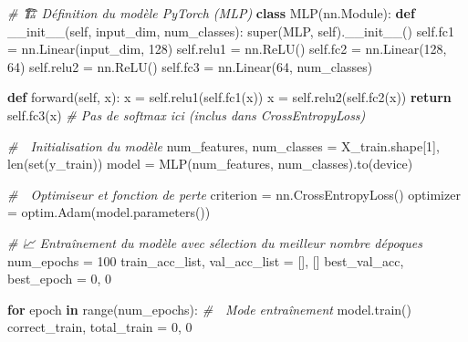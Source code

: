 \documentclass[
  letterpaper,
  DIV=11,
  numbers=noendperiod]{scrartcl}
\newenvironment{Shaded}{}{}
\newcommand{\BuiltInTok}[1]{\textcolor[rgb]{0.00,0.50,0.00}{#1}}
\newcommand{\CommentTok}[1]{\textcolor[rgb]{0.38,0.63,0.69}{\textit{#1}}}
\newcommand{\ControlFlowTok}[1]{\textcolor[rgb]{0.00,0.44,0.13}{\textbf{#1}}}
\newcommand{\DecValTok}[1]{\textcolor[rgb]{0.25,0.63,0.44}{#1}}
\newcommand{\FunctionTok}[1]{\textcolor[rgb]{0.02,0.16,0.49}{#1}}
\newcommand{\KeywordTok}[1]{\textcolor[rgb]{0.00,0.44,0.13}{\textbf{#1}}}
\newcommand{\NormalTok}[1]{#1}
\newcommand{\OperatorTok}[1]{\textcolor[rgb]{0.40,0.40,0.40}{#1}}
\newcommand{\VariableTok}[1]{\textcolor[rgb]{0.10,0.09,0.49}{#1}}
\begin{document}
\begin{Shaded}
\begin{Highlighting}[]
\CommentTok{\# 🏗 Définition du modèle PyTorch (MLP)}
\KeywordTok{class}\NormalTok{ MLP(nn.Module):}
    \KeywordTok{def} \FunctionTok{\_\_init\_\_}\NormalTok{(}\VariableTok{self}\NormalTok{, input\_dim, num\_classes):}
        \BuiltInTok{super}\NormalTok{(MLP, }\VariableTok{self}\NormalTok{).}\FunctionTok{\_\_init\_\_}\NormalTok{()}
        \VariableTok{self}\NormalTok{.fc1 }\OperatorTok{=}\NormalTok{ nn.Linear(input\_dim, }\DecValTok{128}\NormalTok{)}
        \VariableTok{self}\NormalTok{.relu1 }\OperatorTok{=}\NormalTok{ nn.ReLU()}
        \VariableTok{self}\NormalTok{.fc2 }\OperatorTok{=}\NormalTok{ nn.Linear(}\DecValTok{128}\NormalTok{, }\DecValTok{64}\NormalTok{)}
        \VariableTok{self}\NormalTok{.relu2 }\OperatorTok{=}\NormalTok{ nn.ReLU()}
        \VariableTok{self}\NormalTok{.fc3 }\OperatorTok{=}\NormalTok{ nn.Linear(}\DecValTok{64}\NormalTok{, num\_classes)}

    \KeywordTok{def}\NormalTok{ forward(}\VariableTok{self}\NormalTok{, x):}
\NormalTok{        x }\OperatorTok{=} \VariableTok{self}\NormalTok{.relu1(}\VariableTok{self}\NormalTok{.fc1(x))}
\NormalTok{        x }\OperatorTok{=} \VariableTok{self}\NormalTok{.relu2(}\VariableTok{self}\NormalTok{.fc2(x))}
        \ControlFlowTok{return} \VariableTok{self}\NormalTok{.fc3(x)  }\CommentTok{\# Pas de softmax ici (inclus dans CrossEntropyLoss)}

\CommentTok{\# 🎯 Initialisation du modèle}
\NormalTok{num\_features, num\_classes }\OperatorTok{=}\NormalTok{ X\_train.shape[}\DecValTok{1}\NormalTok{], }\BuiltInTok{len}\NormalTok{(}\BuiltInTok{set}\NormalTok{(y\_train))}
\NormalTok{model }\OperatorTok{=}\NormalTok{ MLP(num\_features, num\_classes).to(device)}

\CommentTok{\# 🚀 Optimiseur et fonction de perte}
\NormalTok{criterion }\OperatorTok{=}\NormalTok{ nn.CrossEntropyLoss()}
\NormalTok{optimizer }\OperatorTok{=}\NormalTok{ optim.Adam(model.parameters())}

\CommentTok{\# 📈 Entraînement du modèle avec sélection du meilleur nombre d\textquotesingle{}époques}
\NormalTok{num\_epochs }\OperatorTok{=} \DecValTok{100}
\NormalTok{train\_acc\_list, val\_acc\_list }\OperatorTok{=}\NormalTok{ [], []}
\NormalTok{best\_val\_acc, best\_epoch }\OperatorTok{=} \DecValTok{0}\NormalTok{, }\DecValTok{0}

\ControlFlowTok{for}\NormalTok{ epoch }\KeywordTok{in} \BuiltInTok{range}\NormalTok{(num\_epochs):}
    \CommentTok{\# 🔄 Mode entraînement}
\NormalTok{    model.train()}
\NormalTok{    correct\_train, total\_train }\OperatorTok{=} \DecValTok{0}\NormalTok{, }\DecValTok{0}


\end{Highlighting}
\end{Shaded}
\end{document}
